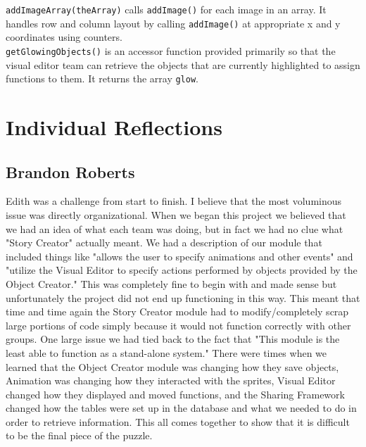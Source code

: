 \documentclass[12pt]{article}
\begin{document}
\texttt{addImageArray(theArray)} calls \texttt{addImage()} for each image in an array. It handles row and column layout by calling \texttt{addImage()} at appropriate x and y coordinates using counters. \\

\texttt{getGlowingObjects()} is an accessor function provided primarily so that the visual editor team can retrieve the objects that are currently highlighted to assign functions to them. It returns the array \texttt{glow}. \\

\section{Individual Reflections}

\subsection{Brandon Roberts}
Edith was a challenge from start to finish. I believe that the most voluminous issue was directly organizational. When we began this project we believed that we had an idea of what each team was doing, but in fact we had no clue what "Story Creator" actually meant. We had a description of our module that included things like "allows the user to specify animations and other events" and "utilize the Visual Editor to specify actions performed by objects provided by the Object Creator." This was completely fine to begin with and made sense but unfortunately the project did not end up functioning in this way.  This meant that time and time again the Story Creator module had to modify/completely scrap large portions of code simply because it would not function correctly with other groups. One large issue we had tied back to the fact that "This module is the least able to function as a stand-alone system." There were times when we learned that the Object Creator module was changing how they save objects, Animation was changing how they interacted with the sprites, Visual Editor changed how they displayed and moved functions, and the Sharing Framework changed how the tables were set up in the database and what we needed to do in order to retrieve information. This all comes together to show that it is difficult to be the final piece of the puzzle.  \\
\end{document}
